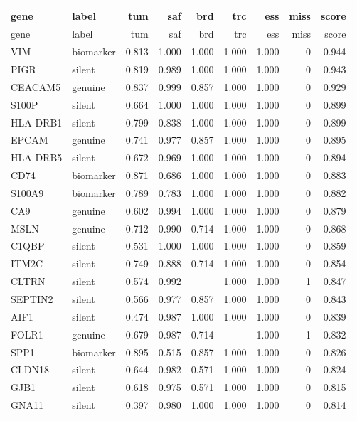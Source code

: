 \begin{longtable}{llrrrrrrr}\hline\hline
gene & label & tum & saf & brd & trc & ess & miss & score\\\hline
\endfirsthead\hline\hline gene & label & tum & saf & brd & trc & ess & miss & score\\\hline\endhead
VIM & biomarker & 0.813 & 1.000 & 1.000 & 1.000 & 1.000 & 0 & 0.944\\
PIGR & silent & 0.819 & 0.989 & 1.000 & 1.000 & 1.000 & 0 & 0.943\\
CEACAM5 & genuine & 0.837 & 0.999 & 0.857 & 1.000 & 1.000 & 0 & 0.929\\
S100P & silent & 0.664 & 1.000 & 1.000 & 1.000 & 1.000 & 0 & 0.899\\
HLA-DRB1 & silent & 0.799 & 0.838 & 1.000 & 1.000 & 1.000 & 0 & 0.899\\
EPCAM & genuine & 0.741 & 0.977 & 0.857 & 1.000 & 1.000 & 0 & 0.895\\
HLA-DRB5 & silent & 0.672 & 0.969 & 1.000 & 1.000 & 1.000 & 0 & 0.894\\
CD74 & biomarker & 0.871 & 0.686 & 1.000 & 1.000 & 1.000 & 0 & 0.883\\
S100A9 & biomarker & 0.789 & 0.783 & 1.000 & 1.000 & 1.000 & 0 & 0.882\\
CA9 & genuine & 0.602 & 0.994 & 1.000 & 1.000 & 1.000 & 0 & 0.879\\
MSLN & genuine & 0.712 & 0.990 & 0.714 & 1.000 & 1.000 & 0 & 0.868\\
C1QBP & silent & 0.531 & 1.000 & 1.000 & 1.000 & 1.000 & 0 & 0.859\\
ITM2C & silent & 0.749 & 0.888 & 0.714 & 1.000 & 1.000 & 0 & 0.854\\
CLTRN & silent & 0.574 & 0.992 &  & 1.000 & 1.000 & 1 & 0.847\\
SEPTIN2 & silent & 0.566 & 0.977 & 0.857 & 1.000 & 1.000 & 0 & 0.843\\
AIF1 & silent & 0.474 & 0.987 & 1.000 & 1.000 & 1.000 & 0 & 0.839\\
FOLR1 & genuine & 0.679 & 0.987 & 0.714 &  & 1.000 & 1 & 0.832\\
SPP1 & biomarker & 0.895 & 0.515 & 0.857 & 1.000 & 1.000 & 0 & 0.826\\
CLDN18 & silent & 0.644 & 0.982 & 0.571 & 1.000 & 1.000 & 0 & 0.824\\
GJB1 & silent & 0.618 & 0.975 & 0.571 & 1.000 & 1.000 & 0 & 0.815\\
GNA11 & silent & 0.397 & 0.980 & 1.000 & 1.000 & 1.000 & 0 & 0.814\\

\end{longtable}
